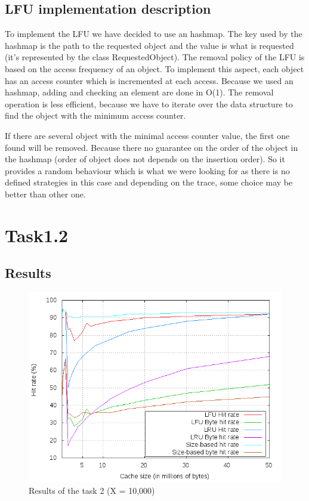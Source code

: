 \subsection{LFU implementation description}

To implement the LFU we have decided to use an hashmap. The key used 
by the hashmap is the path to the requested object and the value is what
is requested (it's represented by the class RequestedObject). The removal
policy of the LFU is based on the access frequency of an object. To
implement this aspect, each object has an access counter which is 
incremented at each access. Because we used an hashmap, adding and
checking an element are done in O(1). The removal operation is less efficient,
because we have to iterate over the data structure to find the object with
the minimum access counter. \newline

If there are several object with the minimal access counter value, the first
one found will be removed. Because there no guarantee on the order of
the object in the hashmap (order of object does not depends on the 
insertion order). So it provides a random behaviour which is what we
were looking for as there is no defined strategies in this case and 
depending on the trace, some choice may be better than other one. 

\section{Task1.2}

\subsection{Results}

\begin{figure}[!ht]
    \centering
    \includegraphics[width=\linewidth]{task2.png}
    \caption{Results of the task 2 (X = 10,000)}
\end{figure}
\FloatBarrier

